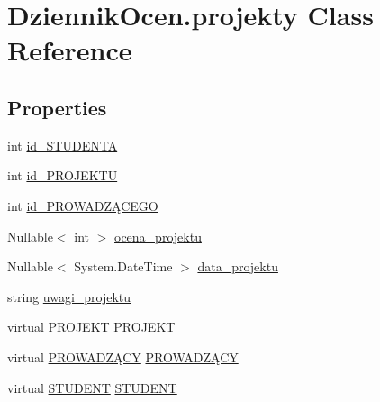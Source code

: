 \hypertarget{class_dziennik_ocen_1_1projekty}{}\section{Dziennik\+Ocen.\+projekty Class Reference}
\label{class_dziennik_ocen_1_1projekty}
\subsection*{Properties}
\begin{DoxyCompactItemize}
\item 
int \hyperlink{class_dziennik_ocen_1_1projekty_ab1ab407c64983c3e6d14c53ed73385b5}{id\+\_\+\+S\+T\+U\+D\+E\+N\+TA}
\item 
int \hyperlink{class_dziennik_ocen_1_1projekty_a55004aeb0ffda08000bd888c6974a90e}{id\+\_\+\+P\+R\+O\+J\+E\+K\+TU}
\item 
int \hyperlink{class_dziennik_ocen_1_1projekty_a4afb3fbaf78b0606f1f886f1484607a8}{id\+\_\+\+P\+R\+O\+W\+A\+D\+ZĄ\+C\+E\+GO}
\item 
Nullable$<$ int $>$ \hyperlink{class_dziennik_ocen_1_1projekty_aebd2599fcd35a7634ab58bd7336f42f7}{ocena\+\_\+projektu}
\item 
Nullable$<$ System.\+Date\+Time $>$ \hyperlink{class_dziennik_ocen_1_1projekty_a2e7cc660a91a81f5bee1b7799fe133fb}{data\+\_\+projektu}
\item 
string \hyperlink{class_dziennik_ocen_1_1projekty_a45c374959bb146a38aac3d9216003b05}{uwagi\+\_\+projektu}
\item 
virtual \hyperlink{class_dziennik_ocen_1_1_p_r_o_j_e_k_t}{P\+R\+O\+J\+E\+KT} \hyperlink{class_dziennik_ocen_1_1projekty_a296d773798f5a7cf94b6d0b882640e33}{P\+R\+O\+J\+E\+KT}
\item 
virtual \hyperlink{class_dziennik_ocen_1_1_p_r_o_w_a_d_z_xC4_x84_c_y}{P\+R\+O\+W\+A\+D\+ZĄ\+CY} \hyperlink{class_dziennik_ocen_1_1projekty_a8c4bc94405e123a6db96a2b8d74ac7e4}{P\+R\+O\+W\+A\+D\+ZĄ\+CY}
\item 
virtual \hyperlink{class_dziennik_ocen_1_1_s_t_u_d_e_n_t}{S\+T\+U\+D\+E\+NT} \hyperlink{class_dziennik_ocen_1_1projekty_a7a8766d51790e50fa5761926969acb47}{S\+T\+U\+D\+E\+NT}
\end{DoxyCompactItemize}


